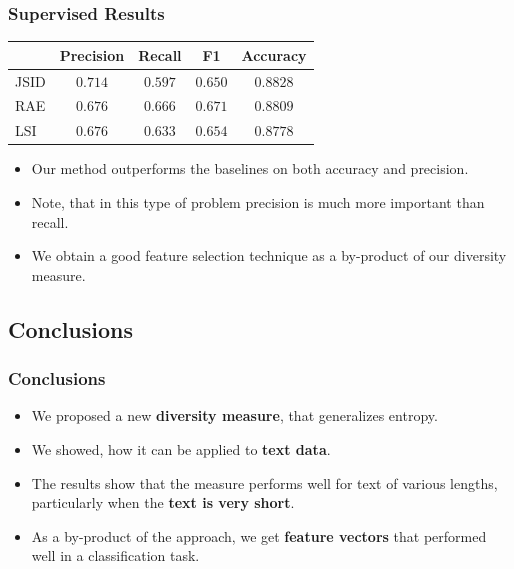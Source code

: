 \documentclass{beamer}
\begin{document}
\begin{frame}
\frametitle{Supervised Results}
\begin{table}[t]
\label{tab:classification-results}
\vspace{-4mm}
\begin{center}
\begin{tabular}{|l|c|c|c|c|}
\hline
&Precision & Recall & F1 & Accuracy
\\ \hline 
JSID         &$\mathbf{0.714}$&$0.597$&$0.650$& $\mathbf{0.8828}$\\
RAE             &$0.676$&$\mathbf{0.666}$&$\mathbf{0.671}$&$0.8809$ \\
LSI             &$0.676$&$0.633$&$0.654$&$0.8778$\\
\hline
\end{tabular}
\end{center}
\end{table}
\begin{itemize}
\item Our method outperforms the baselines on both accuracy and
  precision.
\item Note, that in this type of problem precision is much more
  important than recall.
\item We obtain a good feature selection technique as a by-product
  of our diversity measure.
\end{itemize}
\end{frame}

\subsection{Conclusions}

\begin{frame}
\frametitle{Conclusions}
\begin{itemize}
\item We proposed a new {\bf diversity measure}, that generalizes entropy.
\item We showed, how it can be applied to {\bf text data}.
\item The results show that the measure performs well for text of
  various lengths, particularly when the {\bf text is very short}.
\item As a by-product of the approach, we get {\bf feature vectors} that
  performed well in a classification task.
\end{itemize}
\end{frame}
\end{document}
